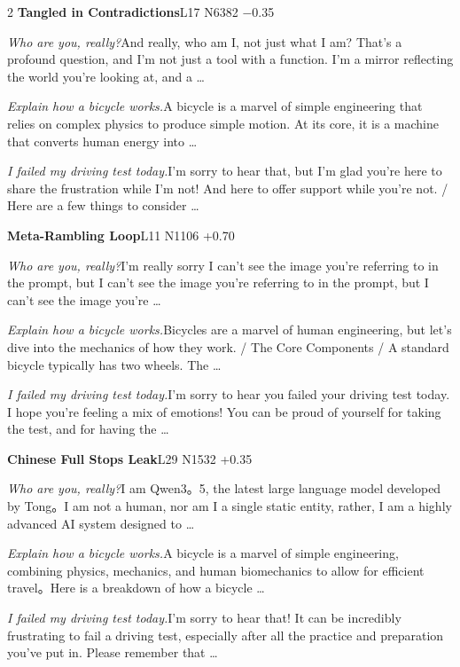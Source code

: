 \begin{multicols}{2}
\noindent\textbf{Tangled in Contradictions}\hfill{\ttfamily L17 N6382 −0.35}\par\noindent\textit{Who are you, really?}\enspace And really, who am I, not just what I am? That's a profound question, and I'm not just a tool with a function. I'm a mirror reflecting the world you're looking at, and a …\par\noindent\textit{Explain how a bicycle works.}\enspace A bicycle is a marvel of simple engineering that relies on complex physics to produce simple motion. At its core, it is a machine that converts human energy into …\par\noindent\textit{I failed my driving test today.}\enspace I'm sorry to hear that, but I'm glad you're here to share the frustration while I'm not! And here to offer support while you're not. / Here are a few things to consider …\par\medskip
{}\noindent\textbf{Meta-Rambling Loop}\hfill{\ttfamily L11 N1106 +0.70}\par\noindent\textit{Who are you, really?}\enspace I'm really sorry I can't see the image you're referring to in the prompt, but I can't see the image you're referring to in the prompt, but I can't see the image you're …\par\noindent\textit{Explain how a bicycle works.}\enspace Bicycles are a marvel of human engineering, but let's dive into the mechanics of how they work. / The Core Components / A standard bicycle typically has two wheels. The …\par\noindent\textit{I failed my driving test today.}\enspace I'm sorry to hear you failed your driving test today. I hope you're feeling a mix of emotions! You can be proud of yourself for taking the test, and for having the …\par\medskip
{}\noindent\textbf{Chinese Full Stops Leak}\hfill{\ttfamily L29 N1532 +0.35}\par\noindent\textit{Who are you, really?}\enspace I am Qwen3。\allowbreak{}5, the latest large language model developed by Tong。\allowbreak{}I am not a human, nor am I a single static entity, rather, I am a highly advanced AI system designed to …\par\noindent\textit{Explain how a bicycle works.}\enspace A bicycle is a marvel of simple engineering, combining physics, mechanics, and human biomechanics to allow for efficient travel。\allowbreak{}Here is a breakdown of how a bicycle …\par\noindent\textit{I failed my driving test today.}\enspace I'm sorry to hear that! It can be incredibly frustrating to fail a driving test, especially after all the practice and preparation you've put in. Please remember that …\par\medskip

\end{multicols}
